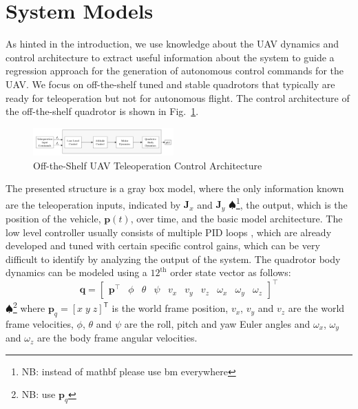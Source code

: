 \documentclass[letterpaper, 10 pt, conference]{ieeeconf}  %
\newcommand\NB[1]{$\spadesuit$\footnote{NB: #1}}
\begin{document}
\section{System Models} \label{sec:sysdyn}
As hinted in the introduction, we use knowledge about the UAV dynamics and control architecture to extract useful information about the system to guide a regression approach for the generation of autonomous control commands for the UAV. We focus on off-the-shelf tuned and stable quadrotors that typically are ready for teleoperation but not for autonomous flight. The control architecture of the off-the-shelf quadrotor is shown in Fig.~\ref{fig:otsctrl}.

\begin{figure}[ht]
    \includegraphics[width=0.48\textwidth]{images/teleopctrl.png}
    \caption{Off-the-Shelf UAV Teleoperation Control Architecture}
    \label{fig:otsctrl}
\end{figure}

The presented structure is a gray box model, where the only information known are the teleoperation inputs, indicated by $\mathbf{J}_x$ and $\mathbf{J}_y$ \NB{instead of mathbf please use bm everywhere}, the output, which is the position of the vehicle, $\mathbf{p}(t)$, over time, and the basic model architecture. The low level controller usually consists of multiple PID loops \cite{esen}, which are already developed and tuned with certain specific control gains, which can be very difficult to identify by analyzing the output of the system. The quadrotor body dynamics can be modeled using a $12^{\text{th}}$ order state vector as follows:
\begin{equation}
    \mathbf{q} = 
    \begin{bmatrix}
    \mathbf{p}^\intercal & \phi & \theta & \psi & v_x & v_y & v_z & \omega_x & \omega_y & \omega_z
    \end{bmatrix}^\intercal \nonumber
\end{equation} 
\NB{use $\bm{p}_q$}
where $\bm{p}_q=[x \; y \; z]^{\mathsf{T}}$ is the world frame position, $v_{x}$, $v_{y}$ and $v_z$ are the world frame velocities, $\phi$, $\theta$ and $\psi$ are the roll, pitch and yaw Euler angles and $\omega_{x}$, $\omega_{y}$ and $\omega_{z}$ are the body frame angular velocities.
\end{document}
